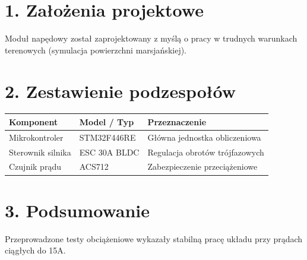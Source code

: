 \section*{1. Założenia projektowe}
Moduł napędowy został zaprojektowany z myślą o pracy w trudnych warunkach terenowych (symulacja powierzchni marsjańskiej).

\section*{2. Zestawienie podzespołów}
\begin{tabularx}{\textwidth}{lXX}
\toprule
\textbf{Komponent} & \textbf{Model / Typ} & \textbf{Przeznaczenie} \\
\midrule
Mikrokontroler & STM32F446RE & Główna jednostka obliczeniowa \\
Sterownik silnika & ESC 30A BLDC & Regulacja obrotów trójfazowych \\
Czujnik prądu & ACS712 & Zabezpieczenie przeciążeniowe \\
\bottomrule
\end{tabularx}

\section*{3. Podsumowanie}
Przeprowadzone testy obciążeniowe wykazały stabilną pracę układu przy prądach ciągłych do 15A.
